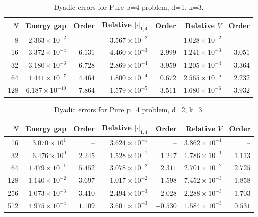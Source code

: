 \begin{table}[!htbp]
\centering\scriptsize
\caption{Dyadic errors for Pure p=4 problem, d=1, k=3.}
\label{tab:dyadic-17}
\begin{tabular}{@{}rrrrrrr@{}}
\toprule
$N$ & Energy gap & Order & Relative $|\cdot|_{1,4}$ & Order & Relative $V$ & Order \\ \midrule
8 & $2.363\!\times\!10^{-2}$ & -- & $3.567\!\times\!10^{-2}$ & -- & $1.028\!\times\!10^{-2}$ & -- \\
16 & $3.372\!\times\!10^{-4}$ & $6.131$ & $4.460\!\times\!10^{-3}$ & $2.999$ & $1.241\!\times\!10^{-3}$ & $3.051$ \\
32 & $3.180\!\times\!10^{-6}$ & $6.728$ & $2.869\!\times\!10^{-4}$ & $3.959$ & $1.205\!\times\!10^{-4}$ & $3.364$ \\
64 & $1.441\!\times\!10^{-7}$ & $4.464$ & $1.800\!\times\!10^{-4}$ & $0.672$ & $2.565\!\times\!10^{-5}$ & $2.232$ \\
128 & $6.187\!\times\!10^{-10}$ & $7.864$ & $1.579\!\times\!10^{-5}$ & $3.511$ & $1.680\!\times\!10^{-6}$ & $3.932$ \\
\bottomrule
\end{tabular}
\end{table}

\begin{table}[!htbp]
\centering\scriptsize
\caption{Dyadic errors for Pure p=4 problem, d=2, k=3.}
\label{tab:dyadic-08}
\begin{tabular}{@{}rrrrrrr@{}}
\toprule
$N$ & Energy gap & Order & Relative $|\cdot|_{1,4}$ & Order & Relative $V$ & Order \\ \midrule
16 & $3.070\!\times\!10^{1}$ & -- & $3.624\!\times\!10^{-1}$ & -- & $3.862\!\times\!10^{-1}$ & -- \\
32 & $6.476\!\times\!10^{0}$ & $2.245$ & $1.528\!\times\!10^{-1}$ & $1.247$ & $1.786\!\times\!10^{-1}$ & $1.113$ \\
64 & $1.479\!\times\!10^{-1}$ & $5.452$ & $3.078\!\times\!10^{-2}$ & $2.311$ & $2.701\!\times\!10^{-2}$ & $2.725$ \\
128 & $1.140\!\times\!10^{-2}$ & $3.697$ & $1.017\!\times\!10^{-2}$ & $1.598$ & $7.452\!\times\!10^{-3}$ & $1.858$ \\
256 & $1.073\!\times\!10^{-3}$ & $3.410$ & $2.494\!\times\!10^{-3}$ & $2.028$ & $2.288\!\times\!10^{-3}$ & $1.703$ \\
512 & $4.975\!\times\!10^{-4}$ & $1.109$ & $3.601\!\times\!10^{-3}$ & $-0.530$ & $1.584\!\times\!10^{-3}$ & $0.531$ \\
\bottomrule
\end{tabular}
\end{table}

